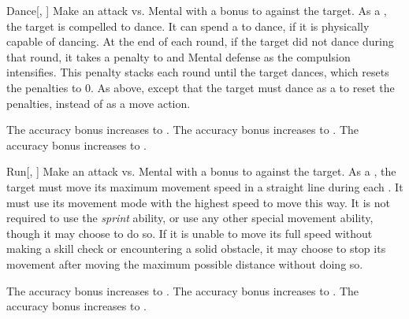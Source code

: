\lowercase{\hypertarget{spell:Dance}{}}\label{spell:Dance}
\begin{freeability}[Rank 2]{\hypertarget{spell:Dance}{Dance}}[, ]
Make an attack vs. Mental with a  bonus to  against the target.
\hit As a , the target is compelled to dance.
It can spend a  to dance, if it is physically capable of dancing.
At the end of each round, if the target did not dance during that round, it takes a  penalty to  and Mental defense as the compulsion intensifies.
This penalty stacks each round until the target dances, which resets the penalties to 0.
\crit As above, except that the target must dance as a  to reset the penalties, instead of as a move action.

\rankline
{} The accuracy bonus increases to .
 The accuracy bonus increases to .
 The accuracy bonus increases to .
\end{freeability}
\vspace{0.25em}



\lowercase{\hypertarget{spell:Run}{}}\label{spell:Run}
\begin{freeability}[Rank 2]{\hypertarget{spell:Run}{Run}}[, ]
Make an attack vs. Mental with a  bonus to  against the target.
\hit As a , the target must move its maximum movement speed in a straight line during each .
It must use its movement mode with the highest speed to move this way.
It is not required to use the \textit{sprint} ability, or use any other special movement ability, though it may choose to do so.
If it is unable to move its full speed without making a skill check or encountering a solid obstacle, it may choose to stop its movement after moving the maximum possible distance without doing so.

\rankline
{} The accuracy bonus increases to .
 The accuracy bonus increases to .
 The accuracy bonus increases to .
\end{freeability}
\vspace{0.25em}



